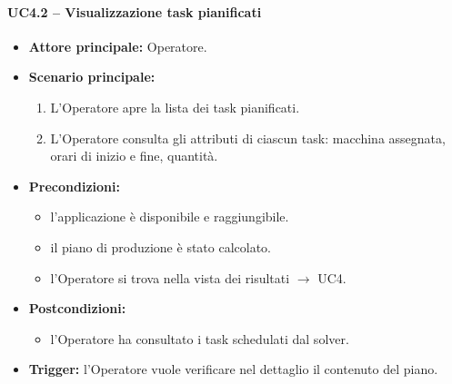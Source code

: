 \paragraph{UC4.2 -- Visualizzazione task pianificati}
\begin{itemize}
    \item \textbf{Attore principale:} Operatore.
    \item \textbf{Scenario principale:}
    \begin{enumerate}
        \item L'Operatore apre la lista dei task pianificati.
        \item L'Operatore consulta gli attributi di ciascun task: macchina assegnata, orari di inizio e fine, quantità.
    \end{enumerate}
    \item \textbf{Precondizioni:}
    \begin{itemize}
        \item l'applicazione è disponibile e raggiungibile.
        \item il piano di produzione è stato calcolato.
        \item l'Operatore si trova nella vista dei risultati $\rightarrow$ UC4.
    \end{itemize}
    \item \textbf{Postcondizioni:}
    \begin{itemize}
        \item l'Operatore ha consultato i task schedulati dal solver.
    \end{itemize}
    \item \textbf{Trigger:} l'Operatore vuole verificare nel dettaglio il contenuto del piano.
\end{itemize}

